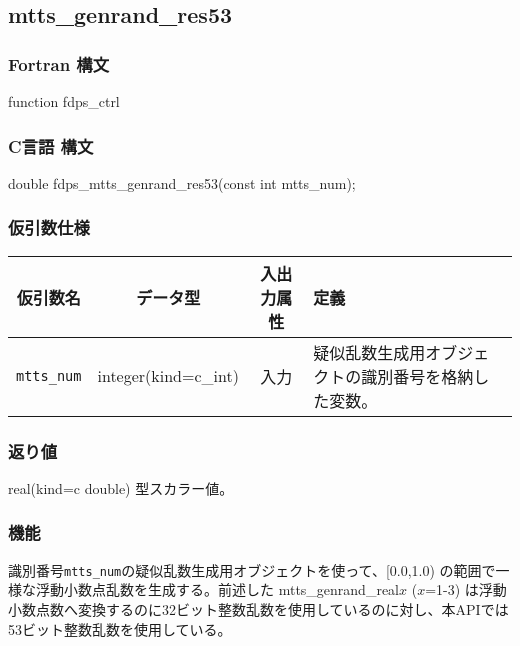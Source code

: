 \subsection{mtts\_genrand\_res53}
\subsubsection*{Fortran 構文}
\begin{screen}
\begin{spverbatim}  
function fdps_ctrl%
\end{spverbatim}
\end{screen}

\subsubsection*{C言語 構文}
\begin{screen}
\begin{spverbatim}  
double fdps_mtts_genrand_res53(const int mtts_num);
\end{spverbatim}
\end{screen}

\subsubsection*{仮引数仕様}
\begin{table}[h]
\begin{tabularx}{\linewidth}{cccX}
\toprule
\rowcolor{Snow2}
仮引数名 & データ型 & 入出力属性 & 定義 \\
\midrule
\verb|mtts_num| & integer(kind=c\_int) & 入力 & 疑似乱数生成用オブジェクトの識別番号を格納した変数。\\
\bottomrule
\end{tabularx}
\end{table}

\subsubsection*{返り値}
real(kind=c double) 型スカラー値。

\subsubsection*{機能}
識別番号\texttt{mtts\_num}の疑似乱数生成用オブジェクトを使って、[0.0,1.0) の範囲で一様な浮動小数点乱数を生成する。前述した mtts\_genrand\_real$x$ ($x$=1-3) は浮動小数点数へ変換するのに32ビット整数乱数を使用しているのに対し、本APIでは53ビット整数乱数を使用している。
\clearpage

